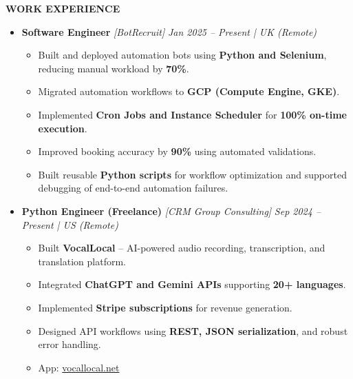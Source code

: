 \documentclass[a4paper,10pt]{article}
\newcommand{\resheading}[1]{{\small \colorbox{mygrey}{\begin{minipage}{0.975\textwidth}{\textbf{#1}}\end{minipage}}}}
\begin{document}
\vspace{3mm}

\resheading{\textbf{WORK EXPERIENCE}}

\begin{itemize}

\item {\bf Software Engineer} \textit{[BotRecruit]}
\textit{\hfill {Jan 2025 -- Present | UK (Remote)}}

\begin{itemize}
\item Built and deployed automation bots using \textbf{Python and Selenium},
reducing manual workload by \textbf{70\%}.
\item Migrated automation workflows to \textbf{GCP (Compute Engine, GKE)}.
\item Implemented \textbf{Cron Jobs and Instance Scheduler}
for \textbf{100\% on-time execution}.
\item Improved booking accuracy by \textbf{90\%} using automated validations.
\item Built reusable \textbf{Python scripts} for workflow optimization and
supported debugging of end-to-end automation failures.
\end{itemize}

\end{itemize}

\begin{itemize}

\item {\bf Python Engineer (Freelance)} \textit{[CRM Group Consulting]}
\textit{\hfill {Sep 2024 -- Present | US (Remote)}}

\begin{itemize}
\item Built \textbf{VocalLocal} -- AI-powered audio recording, transcription, and translation platform.
\item Integrated \textbf{ChatGPT and Gemini APIs} supporting \textbf{20+ languages}.
\item Implemented \textbf{Stripe subscriptions} for revenue generation.
\item Designed API workflows using \textbf{REST, JSON serialization},
and robust error handling.
\item App: \href{https://vocallocal.net/}{vocallocal.net}
\end{itemize}

\end{itemize}
\end{document}

